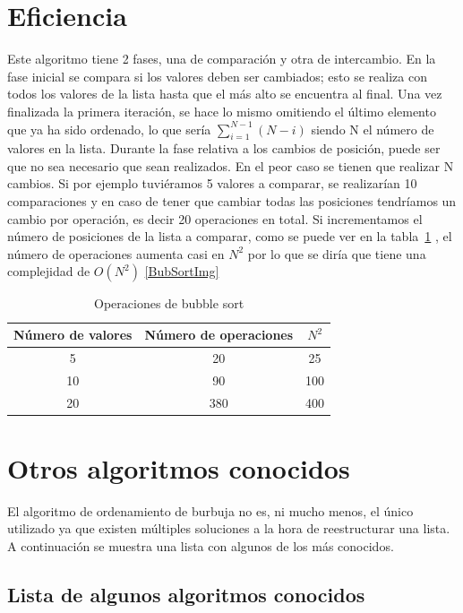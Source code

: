 \documentclass[conference, a4paper]{IEEEtran}
\begin{document}
\section{Eficiencia}
Este algoritmo tiene 2 fases, una de comparación y otra de intercambio.
En la fase inicial se compara si los valores deben ser cambiados; esto se realiza con todos los valores de la lista hasta que el más alto se encuentra al final. Una vez finalizada la primera iteración, se hace lo mismo omitiendo el último elemento que ya ha sido ordenado, lo que sería \(\sum\limits_{i=1}^{N-1}(N-i)\) siendo N el número de valores en la lista.   Durante la fase relativa a los cambios de posición, puede ser que no sea necesario que sean realizados. En el peor caso se tienen que realizar N cambios.
Si por ejemplo tuviéramos 5 valores a comparar, se realizarían 10 comparaciones y en caso de tener que cambiar todas las posiciones tendríamos un cambio por operación, es decir 20 operaciones en total. Si incrementamos el número de posiciones de la lista a comparar, como se puede ver en la tabla~\ref{tab:tabcomplejidad} , el número de operaciones aumenta casi en \(N^2\) por lo que se diría que tiene una complejidad de \(O(N^2)\)\cite{WengrowJay2020ACGt} \ref{BubSortImg}
\begin{table}[H]
    \centering
    \begin{tabular}{|c|c|c|}\hline
         Número de valores&  Número de operaciones & \(N^2\)\\\hline
         5&
    20 & 25 \\\hline
 10& 90& 100\\\hline
 20& 380& 400\\ \hline\end{tabular}
\caption{Operaciones de bubble sort}
\label{tab:tabcomplejidad}


\end{table}

\section{Otros algoritmos conocidos}
El algoritmo de ordenamiento de burbuja no es, ni mucho menos, el único utilizado ya que existen múltiples soluciones a la hora de reestructurar una lista. A continuación se muestra una lista con algunos de los más conocidos.

\subsection{Lista de algunos algoritmos conocidos}
\end{document}
